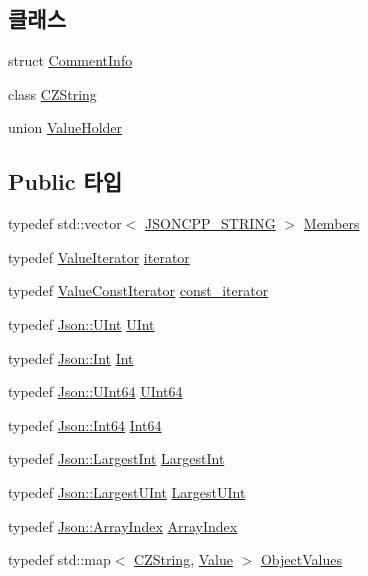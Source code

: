 \subsection*{클래스}
\begin{DoxyCompactItemize}
\item 
struct \hyperlink{struct_json_1_1_value_1_1_comment_info}{Comment\+Info}
\item 
class \hyperlink{class_json_1_1_value_1_1_c_z_string}{C\+Z\+String}
\item 
union \hyperlink{union_json_1_1_value_1_1_value_holder}{Value\+Holder}
\end{DoxyCompactItemize}
\subsection*{Public 타입}
\begin{DoxyCompactItemize}
\item 
typedef std\+::vector$<$ \hyperlink{json_8h_a1e723f95759de062585bc4a8fd3fa4be}{J\+S\+O\+N\+C\+P\+P\+\_\+\+S\+T\+R\+I\+NG} $>$ \hyperlink{class_json_1_1_value_a9ae9069983fc38f1928d76f9c79ac64d}{Members}
\item 
typedef \hyperlink{class_json_1_1_value_iterator}{Value\+Iterator} \hyperlink{class_json_1_1_value_a341cdf2e01f8b3c5b7317aa2f0768c53}{iterator}
\item 
typedef \hyperlink{class_json_1_1_value_const_iterator}{Value\+Const\+Iterator} \hyperlink{class_json_1_1_value_af92282ca92b58b320debd486afb7696a}{const\+\_\+iterator}
\item 
typedef \hyperlink{namespace_json_a800fb90eb6ee8d5d62b600c06f87f7d4}{Json\+::\+U\+Int} \hyperlink{class_json_1_1_value_a0933d59b45793ae4aade1757c322a98d}{U\+Int}
\item 
typedef \hyperlink{namespace_json_a08122e8005b706d982e48cca1e2119c7}{Json\+::\+Int} \hyperlink{class_json_1_1_value_abdf7a7ff73eb130ffcab28504ffdb405}{Int}
\item 
typedef \hyperlink{namespace_json_adf3fa5cb60c619e4f02315ad355e0ca1}{Json\+::\+U\+Int64} \hyperlink{class_json_1_1_value_a8b62564be8c087c6d18de180ff4e13e3}{U\+Int64}
\item 
typedef \hyperlink{namespace_json_ac62566f36fd33115957b91305c9ed1dc}{Json\+::\+Int64} \hyperlink{class_json_1_1_value_a1b86af9f85f0f1baa972c3319fa22695}{Int64}
\item 
typedef \hyperlink{namespace_json_a218d880af853ce786cd985e82571d297}{Json\+::\+Largest\+Int} \hyperlink{class_json_1_1_value_a1cbb82642ed05109b9833e49f042ece7}{Largest\+Int}
\item 
typedef \hyperlink{namespace_json_ae202ecad69725e23443f465e257456d0}{Json\+::\+Largest\+U\+Int} \hyperlink{class_json_1_1_value_a6682a3684d635e03fc06ba229fa24eec}{Largest\+U\+Int}
\item 
typedef \hyperlink{namespace_json_a8048e741f2177c3b5d9ede4a5b8c53c2}{Json\+::\+Array\+Index} \hyperlink{class_json_1_1_value_a184a91566cccca7b819240f0d5561c7d}{Array\+Index}
\item 
typedef std\+::map$<$ \hyperlink{class_json_1_1_value_1_1_c_z_string}{C\+Z\+String}, \hyperlink{class_json_1_1_value}{Value} $>$ \hyperlink{class_json_1_1_value_a08b6c80c3af7071d908dabf044de5388}{Object\+Values}
\end{DoxyCompactItemize}

